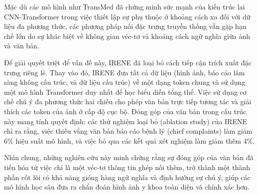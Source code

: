 Mặc dù các mô hình như TransMed \cite{TransMed} đã chứng minh sức mạnh của kiến trúc lai CNN-Transformer trong việc thiết lập sự phụ thuộc ở khoảng cách xa đối với dữ liệu đa phương thức, các phương pháp nối đặc trưng truyền thống vẫn gặp hạn chế lớn do sự khác biệt về không gian véc-tơ và khoảng cách ngữ nghĩa giữa ảnh và văn bản.

Để giải quyết triệt để vấn đề này, IRENE \cite{IRENE} đã loại bỏ cách tiếp cận trích xuất đặc trưng riêng lẻ. Thay vào đó, IRENE đưa tất cả dữ liệu (hình ảnh, báo cáo lâm sàng không cấu trúc, và dữ liệu cấu trúc) về một dạng token chung và sử dụng một mô hình Transformer duy nhất để học biểu diễn tổng thể. Việc sử dụng cơ chế chú ý đa phương thức hai chiều cho phép văn bản trực tiếp tương tác và giải thích các token của ảnh ở cấp độ cục bộ. Đóng góp của văn bản trong cấu trúc này mang tính quyết định: các thử nghiệm loại bỏ (ablation study) của IRENE chỉ ra rằng, việc thiếu vắng văn bản báo cáo bệnh lý (chief complaints) làm giảm 6\% hiệu suất mô hình, và việc bỏ qua các kết quả xét nghiệm làm giảm thêm 4\%.

Nhìn chung, những nghiên cứu này minh chứng rằng sự đóng góp của văn bản đã tiến hóa từ việc chỉ là một véc-tơ thông tin ghép nối thêm, trở thành một thành phần cốt lõi có khả năng gióng hàng ngữ nghĩa và định hướng sự chú ý, giúp các mô hình học sâu đưa ra chẩn đoán hình ảnh y khoa toàn diện và chính xác hơn.

